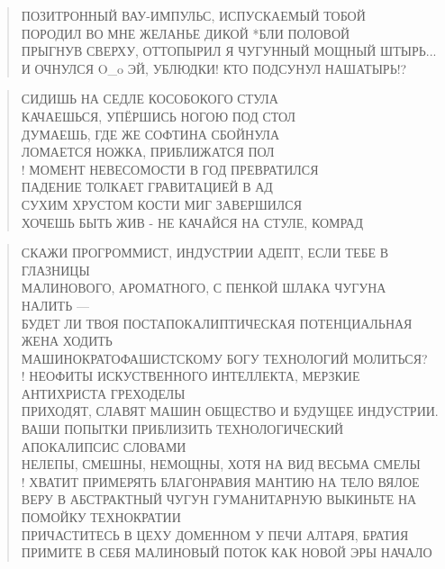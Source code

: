\poemtitle{***}
\begin{verse}
ПОЗИТРОННЫЙ ВАУ-ИМПУЛЬС, ИСПУСКАЕМЫЙ ТОБОЙ\\
ПОРОДИЛ ВО МНЕ ЖЕЛАНЬЕ ДИКОЙ *БЛИ ПОЛОВОЙ\\
ПРЫГНУВ СВЕРХУ, ОТТОПЫРИЛ Я ЧУГУННЫЙ МОЩНЫЙ ШТЫРЬ...\\
И ОЧНУЛСЯ O\_o ЭЙ, УБЛЮДКИ! КТО ПОДСУНУЛ НАШАТЫРЬ!?
\end{verse}

\poemtitle{***}
\begin{verse}
СИДИШЬ НА СЕДЛЕ КОСОБОКОГО СТУЛА\\
КАЧАЕШЬСЯ, УПЁРШИСЬ НОГОЮ ПОД СТОЛ\\
ДУМАЕШЬ, ГДЕ ЖЕ СОФТИНА СБОЙНУЛА\\
ЛОМАЕТСЯ НОЖКА, ПРИБЛИЖАТСЯ ПОЛ\\!
МОМЕНТ НЕВЕСОМОСТИ В ГОД ПРЕВРАТИЛСЯ\\
ПАДЕНИЕ ТОЛКАЕТ ГРАВИТАЦИЕЙ В АД\\
СУХИМ ХРУСТОМ КОСТИ МИГ ЗАВЕРШИЛСЯ\\
ХОЧЕШЬ БЫТЬ ЖИВ - НЕ КАЧАЙСЯ НА СТУЛЕ, КОМРАД
\end{verse}

\poemtitle{***}
\begin{verse}
СКАЖИ ПРОГРОММИСТ, ИНДУСТРИИ АДЕПТ, ЕСЛИ ТЕБЕ В ГЛАЗНИЦЫ\\
МАЛИНОВОГО, АРОМАТНОГО, С ПЕНКОЙ ШЛАКА ЧУГУНА НАЛИТЬ —\\
БУДЕТ ЛИ ТВОЯ ПОСТАПОКАЛИПТИЧЕСКАЯ ПОТЕНЦИАЛЬНАЯ ЖЕНА ХОДИТЬ\\
МАШИНОКРАТОФАШИСТСКОМУ БОГУ ТЕХНОЛОГИЙ МОЛИТЬСЯ?\\!
НЕОФИТЫ ИСКУСТВЕННОГО ИНТЕЛЛЕКТА, МЕРЗКИЕ АНТИХРИСТА ГРЕХОДЕЛЫ\\
ПРИХОДЯТ, СЛАВЯТ МАШИН ОБЩЕСТВО И БУДУЩЕЕ ИНДУСТРИИ.\\
ВАШИ ПОПЫТКИ ПРИБЛИЗИТЬ ТЕХНОЛОГИЧЕСКИЙ АПОКАЛИПСИС СЛОВАМИ\\
НЕЛЕПЫ, СМЕШНЫ, НЕМОЩНЫ, ХОТЯ НА ВИД ВЕСЬМА СМЕЛЫ\\!
ХВАТИТ ПРИМЕРЯТЬ БЛАГОНРАВИЯ МАНТИЮ НА ТЕЛО ВЯЛОЕ\\
ВЕРУ В АБСТРАКТНЫЙ ЧУГУН ГУМАНИТАРНУЮ ВЫКИНЬТЕ НА ПОМОЙКУ ТЕХНОКРАТИИ\\
ПРИЧАСТИТЕСЬ В ЦЕХУ ДОМЕННОМ У ПЕЧИ АЛТАРЯ, БРАТИЯ\\
ПРИМИТЕ В СЕБЯ МАЛИНОВЫЙ ПОТОК КАК НОВОЙ ЭРЫ НАЧАЛО
\end{verse}

